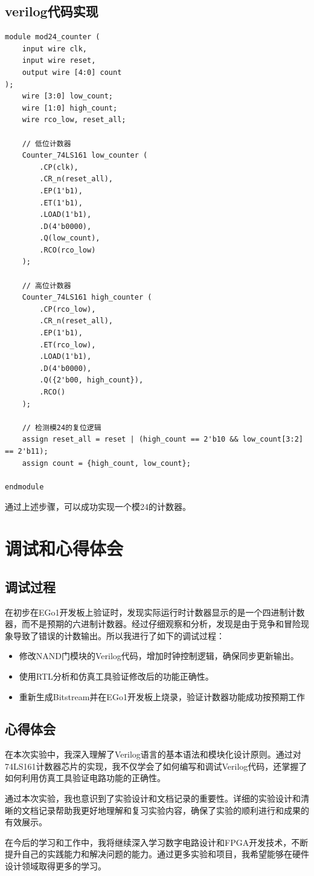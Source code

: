 \documentclass[a4,10pt,zihao=-4]{ctexart}
\begin{document}
\subsection{verilog代码实现}

\begin{verbatim}
module mod24_counter (
    input wire clk,
    input wire reset,
    output wire [4:0] count
);
    wire [3:0] low_count;
    wire [1:0] high_count;
    wire rco_low, reset_all;
    
    // 低位计数器
    Counter_74LS161 low_counter (
        .CP(clk),
        .CR_n(reset_all),
        .EP(1'b1),
        .ET(1'b1),
        .LOAD(1'b1),
        .D(4'b0000),
        .Q(low_count),
        .RCO(rco_low)
    );
    
    // 高位计数器
    Counter_74LS161 high_counter (
        .CP(rco_low),
        .CR_n(reset_all),
        .EP(1'b1),
        .ET(rco_low),
        .LOAD(1'b1),
        .D(4'b0000),
        .Q({2'b00, high_count}),
        .RCO()
    );
    
    // 检测模24的复位逻辑
    assign reset_all = reset | (high_count == 2'b10 && low_count[3:2] == 2'b11);
    assign count = {high_count, low_count};
    
endmodule
\end{verbatim}


通过上述步骤，可以成功实现一个模24的计数器。


\section{调试和心得体会}

\subsection{调试过程}

在初步在EGo1开发板上验证时，发现实际运行时计数器显示的是一个四进制计数器，而不是预期的六进制计数器。经过仔细观察和分析，发现是由于竞争和冒险现象导致了错误的计数输出。所以我进行了如下的调试过程：

\begin{itemize}
    \item 修改NAND门模块的Verilog代码，增加时钟控制逻辑，确保同步更新输出。
    
    \item 使用RTL分析和仿真工具验证修改后的功能正确性。

    \item 重新生成Bitstream并在EGo1开发板上烧录，验证计数器功能成功按预期工作
    
\end{itemize}


\subsection{心得体会}


在本次实验中，我深入理解了Verilog语言的基本语法和模块化设计原则。通过对74LS161计数器芯片的实现，我不仅学会了如何编写和调试Verilog代码，还掌握了如何利用仿真工具验证电路功能的正确性。

通过本次实验，我也意识到了实验设计和文档记录的重要性。详细的实验设计和清晰的文档记录帮助我更好地理解和复习实验内容，确保了实验的顺利进行和成果的有效展示。

在今后的学习和工作中，我将继续深入学习数字电路设计和FPGA开发技术，不断提升自己的实践能力和解决问题的能力。通过更多实验和项目，我希望能够在硬件设计领域取得更多的学习。
\end{document}

